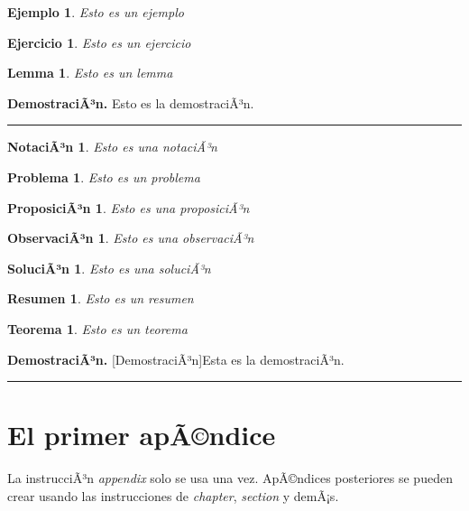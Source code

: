 \documentclass[11pt,spanish]{report}
\newtheorem{theorem}{Teorema}[section]
\newtheorem{example}{Ejemplo}[section]
\newtheorem{exercise}{Ejercicio}[section]
\newtheorem{lemma}{Lemma}[section]
\newtheorem{notation}{NotaciÃ³n}[section]
\newtheorem{problem}{Problema}[section]
\newtheorem{proposition}{ProposiciÃ³n}[section]
\newtheorem{remark}{ObservaciÃ³n}[section]
\newtheorem{solution}{SoluciÃ³n}[section]
\newtheorem{summary}{Resumen}[section]
\newenvironment{proof}[1][DemostraciÃ³n]{\textbf{#1.} }{\ \rule{0.5em}{0.5em}}
\begin{document}
\begin{example}
Esto es un ejemplo
\end{example}

\begin{exercise}
Esto es un ejercicio
\end{exercise}

\begin{lemma}
Esto es un lemma
\end{lemma}

\begin{proof}
Esto es la demostraciÃ³n.
\end{proof}

\begin{notation}
Esto es una notaciÃ³n
\end{notation}

\begin{problem}
Esto es un problema
\end{problem}

\begin{proposition}
Esto es una proposiciÃ³n
\end{proposition}

\begin{remark}
Esto es una observaciÃ³n
\end{remark}

\begin{solution}
Esto es una soluciÃ³n
\end{solution}

\begin{summary}
Esto es un resumen
\end{summary}

\begin{theorem}
Esto es un teorema
\end{theorem}

\begin{proof}
[DemostraciÃ³n]Esta es la demostraciÃ³n.
\end{proof}

\appendix 

\chapter{El primer apÃ©ndice}

La instrucciÃ³n \emph{appendix} solo se usa una vez. ApÃ©ndices posteriores se pueden crear usando las instrucciones de \emph{chapter}, \emph{section} y demÃ¡s.

\printbibliography
\end{document}
